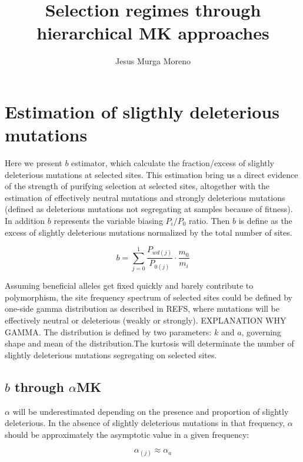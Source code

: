 \documentclass[11pt]{article}
\begin{document}
   

\title{Selection regimes through hierarchical MK approaches}    
\author{Jesus Murga Moreno}

\maketitle

\section{Estimation of sligthly deleterious mutations}    
	
	Here we present $b$ estimator, which calculate the fraction/excess of slightly deleterious mutations at selected sites. This estimation bring us a direct evidence of the strength of purifying selection at selected sites, altogether with the estimation of effectively neutral mutations and strongly deleterious mutations (defined as deleterious mutations not segregating at samples because of fitness). In addition $b$ represents the variable biasing $P_{i}/P_{0}$ ratio. Then $b$ is define as the excess of slightly deleterious mutations normalized by the total number of sites.
	
\begin{equation}
	b = \sum_{j=0}^{1}\frac{P_{wd(j)}}{P_{0(j)}}\cdot\frac{m_{0}}{m_{i}}
\end{equation}

Assuming beneficial alleles get fixed quickly and barely contribute to polymorphism, the site frequency spectrum of selected sites could be defined by one-side gamma distribution as described in REFS, where mutations will be effectively neutral or deleterious (weakly or strongly). EXPLANATION WHY GAMMA. The distribution is defined by two parameters: $k$ and $a$, governing shape and mean of the distribution.The kurtosis will determinate the number of slightly deleterious mutations segregating on selected sites. 


\subsection{$b$ through $\alpha$MK}
$\alpha$ will be underestimated depending on the presence and proportion of slightly deleterious. In the absence of slightly deleterious mutations in that frequency, $\alpha$ should be approximately the asymptotic value in a given frequency:

\begin{equation}
	\alpha_{(j)} \approx \alpha_{a}
\end{equation}
\end{document}
